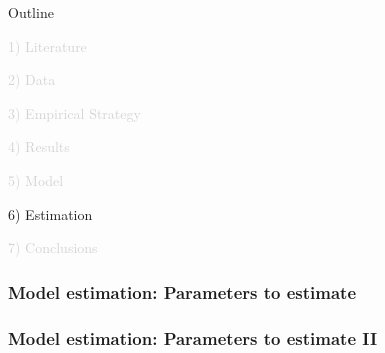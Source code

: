 \documentclass[aspectratio=169]{beamer}
\begin{document}
\begin{frame}[noframenumbering]{Outline}

\Large

\textcolor{lightgray}{1) Literature}

\vspace{4mm}

\textcolor{lightgray}{2) Data}

\vspace{4mm}

\textcolor{lightgray}{3) Empirical Strategy}

\vspace{4mm}

\textcolor{lightgray}{4) Results}

\vspace{4mm}

\textcolor{lightgray}{5) Model}

\vspace{4mm}

6) Estimation

\vspace{4mm}

\textcolor{lightgray}{7) Conclusions}

\end{frame}


\begin{frame}
\frametitle{\textbf{Model estimation}: Parameters to estimate} \label{parameters1}

\footnotesize


\end{frame}


\begin{frame}
\frametitle{\textbf{Model estimation}: Parameters to estimate II} \label{parameters2}

\begin{center}
    \footnotesize
    
\end{center}

\end{frame}

\end{document}
